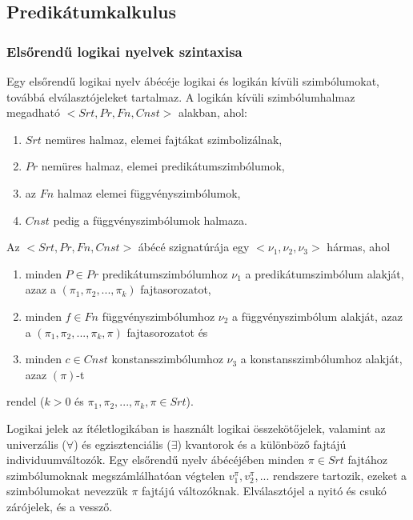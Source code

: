 \documentclass[margin=0px]{article}
\begin{document}
\subsection{Predikátumkalkulus}

\subsubsection{Elsőrendű logikai nyelvek szintaxisa}

Egy elsőrendű logikai nyelv ábécéje logikai és logikán kívüli szimbólumokat, továbbá elválasztójeleket tartalmaz.
A logikán kívüli szimbólumhalmaz megadható $<Srt, Pr, Fn, Cnst>$ alakban, ahol:

\begin{enumerate}
    \item	$Srt$ nemüres halmaz, elemei fajtákat szimbolizálnak,

    \item	$Pr$ nemüres halmaz, elemei predikátumszimbólumok,

    \item	az $Fn$ halmaz elemei függvényszimbólumok,

    \item	$Cnst$ pedig a függvényszimbólumok halmaza.
\end{enumerate}

\noindent Az $<Srt, Pr, Fn, Cnst>$ ábécé szignatúrája egy $<\nu_{1}, \nu_{2}, \nu_{3}>$ hármas, ahol

\begin{enumerate}
    \item	minden $P \in Pr$ predikátumszimbólumhoz $\nu_{1}$ a predikátumszimbólum alakját,
          azaz a $(\pi_{1}, \pi_{2}, ..., \pi_{k})$ fajtasorozatot,

    \item	minden $f \in Fn$ függvényszimbólumhoz $\nu_{2}$ a függvényszimbólum alakját,
          azaz a $(\pi_{1}, \pi_{2}, ..., \pi_{k}, \pi)$ fajtasorozatot és

    \item	minden $c \in Cnst$ konstansszimbólumhoz $\nu_{3}$ a konstansszimbólumhoz alakját,
          azaz $(\pi)$-t
\end{enumerate}

\noindent rendel ($k > 0$ és $\pi_{1}, \pi_{2}, ..., \pi_{k}, \pi \in Srt$).

Logikai jelek az ítéletlogikában is használt logikai összekötőjelek, valamint az univerzális ($\forall$)
és egzisztenciális ($\exists$) kvantorok és a különböző fajtájú individuumváltozók. Egy elsőrendű
nyelv ábécéjében minden $\pi \in Srt$ fajtához szimbólumoknak megszámlálhatóan végtelen
$v_{1}^{\pi}, v_{2}^{\pi}, ...$ rendszere tartozik, ezeket a szimbólumokat nevezzük $\pi$ fajtájú
változóknak. Elválasztójel a nyitó és csukó zárójelek, és a vessző.
\end{document}
